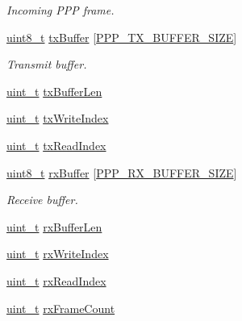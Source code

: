 \begin{DoxyCompactItemize}
\begin{DoxyCompactList}\small\item\em Incoming P\+PP frame. \end{DoxyCompactList}\item 
\hyperlink{stdint_8h_aba7bc1797add20fe3efdf37ced1182c5}{uint8\+\_\+t} \hyperlink{struct__PppContext_a4e0e252ab245c4a21c9664bc4bb84975}{tx\+Buffer} \mbox{[}\hyperlink{ppp_8h_aeceded3683e4b7adb67239e8e2225e71}{P\+P\+P\+\_\+\+T\+X\+\_\+\+B\+U\+F\+F\+E\+R\+\_\+\+S\+I\+ZE}\mbox{]}
\begin{DoxyCompactList}\small\item\em Transmit buffer. \end{DoxyCompactList}\item 
\hyperlink{compiler__port_8h_a12a1e9b3ce141648783a82445d02b58d}{uint\+\_\+t} \hyperlink{struct__PppContext_ad899c3582a9524931af189fa5b589ee3}{tx\+Buffer\+Len}
\item 
\hyperlink{compiler__port_8h_a12a1e9b3ce141648783a82445d02b58d}{uint\+\_\+t} \hyperlink{struct__PppContext_a6b97b169baee1195d9f7e8d18bd0e6b0}{tx\+Write\+Index}
\item 
\hyperlink{compiler__port_8h_a12a1e9b3ce141648783a82445d02b58d}{uint\+\_\+t} \hyperlink{struct__PppContext_a5f32e340f97ef748758b1f13d0282c79}{tx\+Read\+Index}
\item 
\hyperlink{stdint_8h_aba7bc1797add20fe3efdf37ced1182c5}{uint8\+\_\+t} \hyperlink{struct__PppContext_af7570652d9bf2726a57132474f4015d3}{rx\+Buffer} \mbox{[}\hyperlink{ppp_8h_a0be94e0f451395fe16c2597482786de3}{P\+P\+P\+\_\+\+R\+X\+\_\+\+B\+U\+F\+F\+E\+R\+\_\+\+S\+I\+ZE}\mbox{]}
\begin{DoxyCompactList}\small\item\em Receive buffer. \end{DoxyCompactList}\item 
\hyperlink{compiler__port_8h_a12a1e9b3ce141648783a82445d02b58d}{uint\+\_\+t} \hyperlink{struct__PppContext_a24667af05f0d2c763b576c09bdc7d4e2}{rx\+Buffer\+Len}
\item 
\hyperlink{compiler__port_8h_a12a1e9b3ce141648783a82445d02b58d}{uint\+\_\+t} \hyperlink{struct__PppContext_a479c7cad1ff067533c34164490205f07}{rx\+Write\+Index}
\item 
\hyperlink{compiler__port_8h_a12a1e9b3ce141648783a82445d02b58d}{uint\+\_\+t} \hyperlink{struct__PppContext_af24ec29275eba5e42fd5ed2f07c802d3}{rx\+Read\+Index}
\item 
\hyperlink{compiler__port_8h_a12a1e9b3ce141648783a82445d02b58d}{uint\+\_\+t} \hyperlink{struct__PppContext_aa6ca6bde999b31d8fb2a7c34fa3b16cc}{rx\+Frame\+Count}
\end{DoxyCompactItemize}


